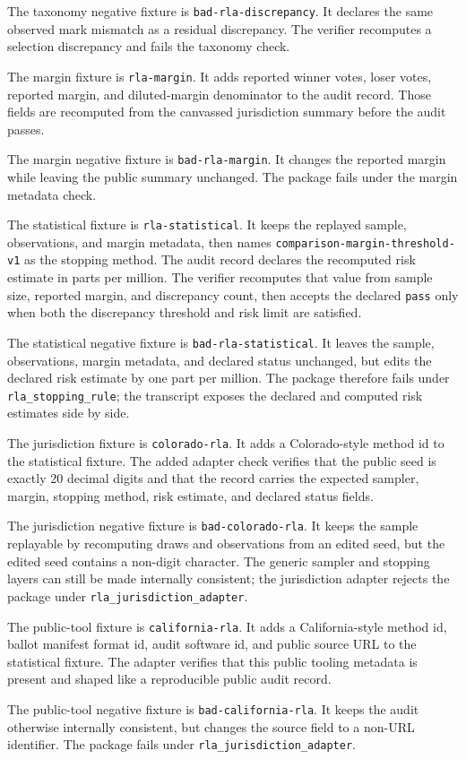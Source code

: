 The taxonomy negative fixture is \texttt{bad-rla-discrepancy}. It declares the
same observed mark mismatch as a residual discrepancy. The verifier recomputes
a selection discrepancy and fails the taxonomy check.

The margin fixture is \texttt{rla-margin}. It adds reported winner votes, loser
votes, reported margin, and diluted-margin denominator to the audit record.
Those fields are recomputed from the canvassed jurisdiction summary before the
audit passes.

The margin negative fixture is \texttt{bad-rla-margin}. It changes the
reported margin while leaving the public summary unchanged. The package fails
under the margin metadata check.

The statistical fixture is \texttt{rla-statistical}. It keeps the replayed
sample, observations, and margin metadata, then names
\texttt{comparison-margin-threshold-v1} as the stopping method. The audit
record declares the recomputed risk estimate in parts per million. The verifier
recomputes that value from sample size, reported margin, and discrepancy count,
then accepts the declared \texttt{pass} only when both the discrepancy threshold
and risk limit are satisfied.

The statistical negative fixture is \texttt{bad-rla-statistical}. It leaves the
sample, observations, margin metadata, and declared status unchanged, but edits
the declared risk estimate by one part per million. The package therefore fails
under \texttt{rla\_stopping\_rule}; the transcript exposes the declared and
computed risk estimates side by side.

The jurisdiction fixture is \texttt{colorado-rla}. It adds a Colorado-style
method id to the statistical fixture. The added adapter check verifies that the
public seed is exactly 20 decimal digits and that the record carries the
expected sampler, margin, stopping method, risk estimate, and declared status
fields.

The jurisdiction negative fixture is \texttt{bad-colorado-rla}. It keeps the
sample replayable by recomputing draws and observations from an edited seed,
but the edited seed contains a non-digit character. The generic sampler and
stopping layers can still be made internally consistent; the jurisdiction
adapter rejects the package under \texttt{rla\_jurisdiction\_adapter}.

The public-tool fixture is \texttt{california-rla}. It adds a California-style
method id, ballot manifest format id, audit software id, and public source URL
to the statistical fixture. The adapter verifies that this public tooling
metadata is present and shaped like a reproducible public audit record.

The public-tool negative fixture is \texttt{bad-california-rla}. It keeps the
audit otherwise internally consistent, but changes the source field to a
non-URL identifier. The package fails under
\texttt{rla\_jurisdiction\_adapter}.
